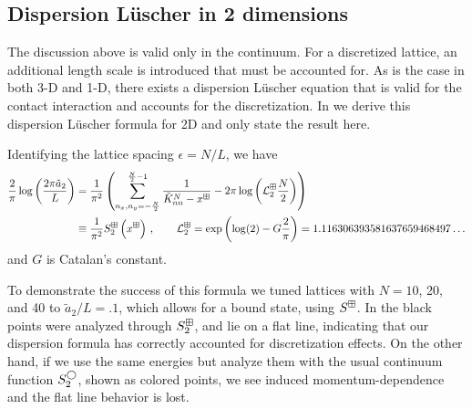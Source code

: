\subsection{Dispersion L\"uscher in 2 dimensions}

The discussion above is valid only in the continuum.
For a discretized lattice, an additional length scale is introduced that must be accounted for.
As is the case in both 3-D and 1-D, there exists a dispersion L\"uscher equation that is valid for the contact interaction and accounts for the discretization.
In  we derive this dispersion L\"uscher formula for 2D and only state the result here.

Identifying the lattice spacing $\epsilon=N/L$, we have
\begin{align}
    \frac{2}{\pi} \log \left(\frac{2\pi \tilde a_{2}}{L}\right)
    &=
    \frac{1}{\pi^2}
    \left(
        \sum_{n_x,n_y=-\frac{N}{2}}^{\frac{N}{2}-1}\frac{1}{\tilde{K}^N_{nn}-x^\boxplus}
        -2\pi \log \left(\mathcal{L}^\boxplus_2\frac{N}{2}\right)
    \right)
    \nonumber\\
    &\equiv\frac{1}{\pi^2}S^{\boxplus}_2\left(x^\boxplus\right)\, ,\label{eq:2d dispersion luscher}
	\qquad
    \mathcal{L}^\boxplus_{2}
    =
    \exp \left(\log (2)-G \frac{2}{\pi}\right)
    =
    1.116306393581637659468497 \ldots
\end{align}
and $G$ is Catalan's constant. %


To demonstrate the success of this formula we tuned lattices with $N=10$, 20, and 40 to $\tilde a_{2}/L = .1$, which allows for a bound state, using $S^{\boxplus}$.
In  the black points were analyzed through $S^\boxplus_2$, and lie on a flat line, indicating that our dispersion \Luscher formula has correctly accounted for discretization effects.
On the other hand, if we use the same energies but analyze them with the usual continuum \Luscher function $S^{\bigcirc}_2$, shown as colored points, we see induced momentum-dependence and the flat line behavior is lost.


